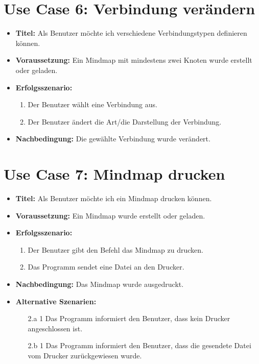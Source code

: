 \section*{Use Case 6: Verbindung verändern}
\begin{itemize}
\item \textbf{Titel:} Als Benutzer möchte ich verschiedene Verbindungstypen definieren können.
\item \textbf{Voraussetzung:} Ein Mindmap mit mindestens zwei Knoten wurde erstellt oder geladen.
\item \textbf{Erfolgsszenario:}
	\begin{enumerate}
	\item Der Benutzer wählt eine Verbindung aus.
	\item Der Benutzer ändert die Art/die Darstellung der Verbindung.
	\end{enumerate}
\item \textbf{Nachbedingung:} Die gewählte Verbindung wurde verändert.
\end{itemize}

\section*{Use Case 7: Mindmap drucken}
\begin{itemize}
\item \textbf{Titel:} Als Benutzer möchte ich ein Mindmap drucken können.
\item \textbf{Voraussetzung:} Ein Mindmap wurde erstellt oder geladen.
\item \textbf{Erfolgsszenario:}
	\begin{enumerate}
	\item Der Benutzer gibt den Befehl das Mindmap zu drucken.
	\item Das Programm sendet eine Datei an den Drucker.
	\end{enumerate}
\item \textbf{Nachbedingung:} Das Mindmap wurde ausgedruckt.
\item \textbf{Alternative Szenarien:}
	\begin{enumerate}
	\item [2.a 1] Das Programm informiert den Benutzer, dass kein Drucker angeschlossen ist.
	\item []
	\item [2.b 1] Das Programm informiert den Benutzer, dass die gesendete Datei vom Drucker zurückgewiesen wurde.
	\end{enumerate}
\end{itemize}

